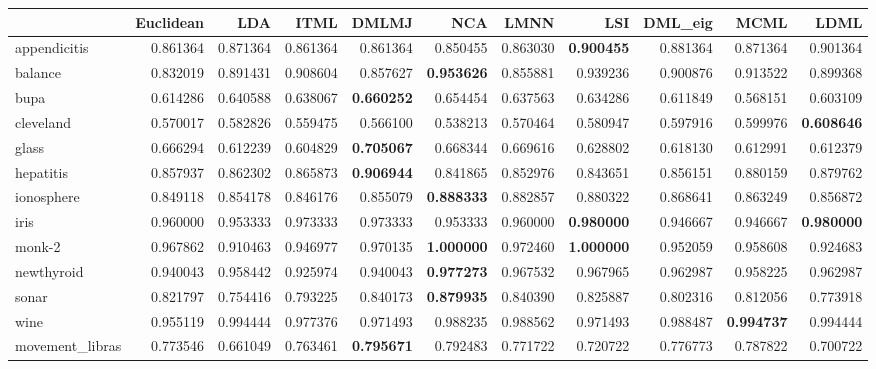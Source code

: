 \begin{tabular}{lrrrrrrrrrr}
\toprule
{} &  Euclidean &       LDA &      ITML &     DMLMJ &       NCA &      LMNN &       LSI &   DML\_eig &      MCML &      LDML \\
\midrule
appendicitis    &   0.861364 &  0.871364 &  0.861364 &  0.861364 &  0.850455 &  0.863030 &  \textbf{0.900455} &  0.881364 &  0.871364 &  0.901364 \\
balance         &   0.832019 &  0.891431 &  0.908604 &  0.857627 &  \textbf{0.953626} &  0.855881 &  0.939236 &  0.900876 &  0.913522 &  0.899368 \\
bupa            &   0.614286 &  0.640588 &  0.638067 &  \textbf{0.660252} &  0.654454 &  0.637563 &  0.634286 &  0.611849 &  0.568151 &  0.603109 \\
cleveland       &   0.570017 &  0.582826 &  0.559475 &  0.566100 &  0.538213 &  0.570464 &  0.580947 &  0.597916 &  0.599976 &  \textbf{0.608646} \\
glass           &   0.666294 &  0.612239 &  0.604829 &  \textbf{0.705067} &  0.668344 &  0.669616 &  0.628802 &  0.618130 &  0.612991 &  0.612379 \\
hepatitis       &   0.857937 &  0.862302 &  0.865873 &  \textbf{0.906944} &  0.841865 &  0.852976 &  0.843651 &  0.856151 &  0.880159 &  0.879762 \\
ionosphere      &   0.849118 &  0.854178 &  0.846176 &  0.855079 &  \textbf{0.888333} &  0.882857 &  0.880322 &  0.868641 &  0.863249 &  0.856872 \\
iris            &   0.960000 &  0.953333 &  0.973333 &  0.973333 &  0.953333 &  0.960000 &  \textbf{0.980000} &  0.946667 &  0.946667 &  \textbf{0.980000} \\
monk-2          &   0.967862 &  0.910463 &  0.946977 &  0.970135 &  \textbf{1.000000} &  0.972460 &  \textbf{1.000000} &  0.952059 &  0.958608 &  0.924683 \\
newthyroid      &   0.940043 &  0.958442 &  0.925974 &  0.940043 &  \textbf{0.977273} &  0.967532 &  0.967965 &  0.962987 &  0.958225 &  0.962987 \\
sonar           &   0.821797 &  0.754416 &  0.793225 &  0.840173 &  \textbf{0.879935} &  0.840390 &  0.825887 &  0.802316 &  0.812056 &  0.773918 \\
wine            &   0.955119 &  0.994444 &  0.977376 &  0.971493 &  0.988235 &  0.988562 &  0.971493 &  0.988487 &  \textbf{0.994737} &  0.994444 \\
movement\_libras &   0.773546 &  0.661049 &  0.763461 &  \textbf{0.795671} &  0.792483 &  0.771722 &  0.720722 &  0.776773 &  0.787822 &  0.700722 \\

\end{tabular}

